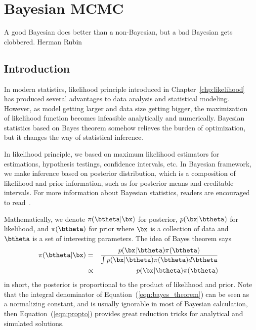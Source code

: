 \chapter{Bayesian MCMC}
\label{chp:mcmc}

\inspire%
{A good Bayesian does better than a non-Bayesian, but a bad Bayesian gets clobbered.}%
{Herman Rubin}


\section{Introduction}

In modern statistics, likelihood principle introduced in
Chapter~\ref{chp:likelihood} has produced several advantages to data analysis
and statistical modeling. However, as model getting larger and data size
getting bigger, the maximization of likelihood function becomes infeasible
analytically and numerically. Bayesian statistics based on Bayes theorem
somehow relieves the burden of optimization, but it changes the way of
statistical inference.

In likelihood principle, we based on maximum likelihood
estimators for estimations, hypothesis testings, confidence intervals, etc.
In Bayesian framework, we make inference based on posterior distribution,
which is a composition of likelihood and prior information,
such as for posterior means and creditable intervals.
For more information about Bayesian statistics, readers are encouraged to
read~\citet{Berger1993,Gelman2003}.

Mathematically, we denote $\pi(\btheta|\bx)$ for posterior, $p(\bx|\btheta)$
for likelihood, and $\pi(\btheta)$ for prior where $\bx$ is a collection of
data and $\btheta$ is a set of interesting parameters. The idea of Bayes
theorem says
\begin{eqnarray}
\pi(\btheta|\bx)
& = & \frac{p(\bx|\btheta) \pi(\btheta)}{\int p(\bx|\btheta) \pi(\btheta) d\btheta}
      \label{eqn:bayes_theorem} \\
& \propto & p(\bx|\btheta) \pi(\btheta)
            \label{eqn:propto}
\end{eqnarray}
in short, the posterior is proportional to the product of likelihood and prior.
Note that the integral denominator of Equation~(\ref{eqn:bayes_theorem}) can be
seen as a normalizing constant, and is usually ignorable in most of Bayesian
calculation, then Equation~(\ref{eqn:propto}) provides great reduction tricks
for analytical and simulated solutions. 

